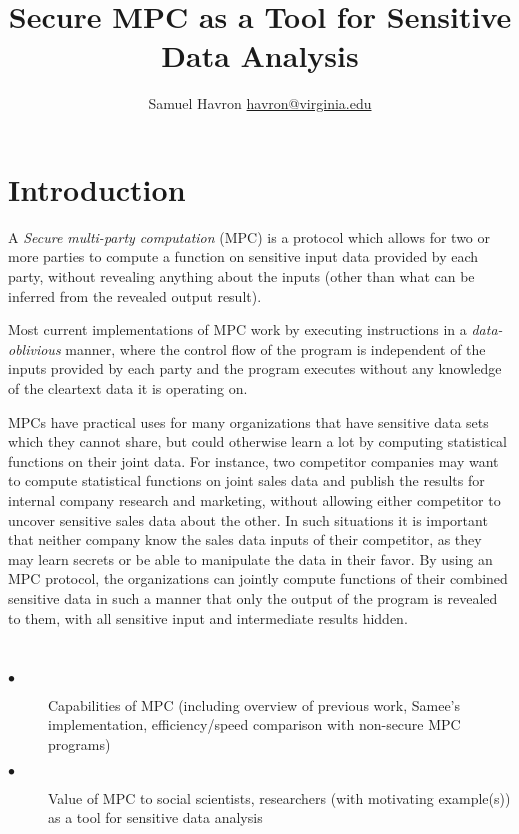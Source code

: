 \documentclass{article}
\author{Samuel Havron \textlangle{}\href{mailto:havron@virginia.edu}{havron@virginia.edu}\textrangle{}}
\title{\textbf{Secure MPC as a Tool for Sensitive Data Analysis}}
\begin{document}
\maketitle
\section{Introduction}
A \emph{Secure multi-party computation} (MPC) is a protocol which allows for two or more parties to compute a function on sensitive input data provided by each party, without revealing anything about the inputs (other than what can be inferred from the revealed output result). 

Most current implementations of MPC work by executing instructions in a \emph{data-oblivious} manner, where the control flow of the program is independent of the inputs provided by each party and the program executes without any knowledge of the cleartext data it is operating on.  %

MPCs have practical uses for many organizations that have sensitive data sets which they cannot share, but could otherwise learn a lot by computing statistical functions on their joint data.  For instance, two competitor companies may want to compute statistical functions on joint sales data and publish the results for internal company research and marketing, without allowing either competitor to uncover sensitive sales data about the other. In such situations it is important that neither company know the sales data inputs of their competitor, as they may learn secrets or be able to manipulate the data in their favor. By using an MPC protocol, the organizations can jointly compute functions of their combined sensitive data in such a manner that only the output of the program is revealed to them, with all sensitive input and intermediate results hidden. 


\\
\begin{description}
\item[$\bullet$] Capabilities of MPC (including overview of previous work, Samee's implementation, efficiency/speed comparison with non-secure MPC programs) 
\item[$\bullet$] Value of MPC to social scientists, researchers (with motivating example(s)) as a tool for sensitive data analysis
\end{description}
\end{document}
